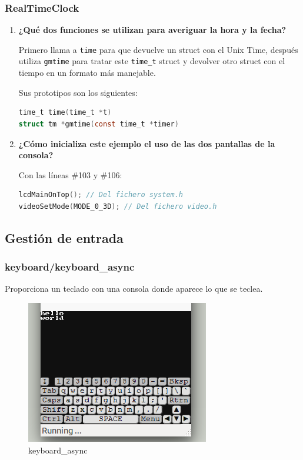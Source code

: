 \subsubsection{RealTimeClock}

\begin{enumerate}
	\item \textbf{¿Qué dos funciones se utilizan para averiguar la hora y la fecha?}

	Primero llama a {\tt time} para que devuelve un struct con el Unix Time, después utiliza {\tt gmtime} para tratar este {\tt time\_t} struct y devolver otro struct con el tiempo en un formato más manejable.

	Sus prototipos son los siguientes:

	\begin{lstlisting}[basicstyle=\ttfamily\scriptsize,language=C,frame=single]
time_t time(time_t *t)
struct tm *gmtime(const time_t *timer)
	\end{lstlisting}

	\item \textbf{¿Cómo inicializa este ejemplo el uso de las dos pantallas de la consola?}
	
	Con las líneas \#103 y \#106:
	
	\begin{lstlisting}[basicstyle=\ttfamily\scriptsize,language=C,frame=single]
         lcdMainOnTop(); // Del fichero system.h
videoSetMode(MODE_0_3D); // Del fichero video.h
	\end{lstlisting}
\end{enumerate}

\newpage

\subsection{Gestión de entrada}

\subsubsection{keyboard/keyboard\_async}

Proporciona un teclado con una consola donde aparece lo que se teclea.

\begin{figure}[H] 
\centering
\includegraphics[scale=0.75]{P2Media/keyboard_async.png}
\caption{keyboard\_async}
\end{figure}

